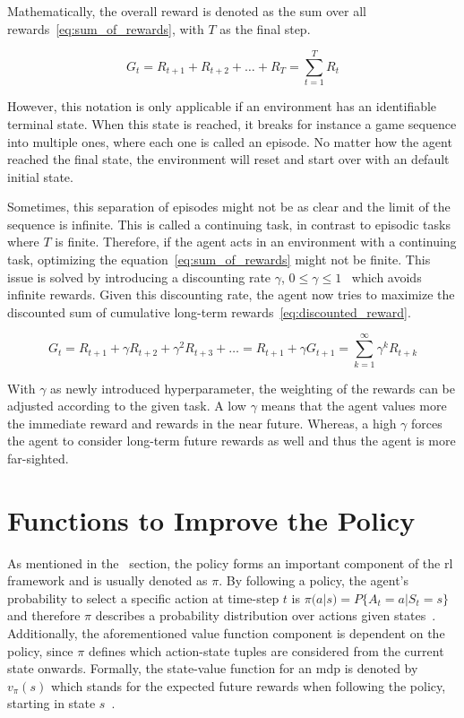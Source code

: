 \documentclass[draft,final]{vutinfth} %
\begin{document}
    Mathematically, the overall reward is denoted as the sum over all rewards~\eqref{eq:sum_of_rewards}, with $T$ as the final step.

    \begin{equation}
        G_t=R_{t+1} + R_{t+2}+ \ldots + R_{T}  =\sum_{t=1}^{T} R_{t}\label{eq:sum_of_rewards}
    \end{equation}

    However, this notation is only applicable if an environment has an identifiable terminal state.
    When this state is reached, it breaks for instance a game sequence into multiple ones, where each one is called an episode.
    No matter how the agent reached the final state, the environment will reset and start over with an default initial state.

    Sometimes, this separation of episodes might not be as clear and the limit of the sequence is infinite.
    This is called a continuing task, in contrast to episodic tasks where $T$ is finite.
    Therefore, if the agent acts in an environment with a continuing task, optimizing the equation~\eqref{eq:sum_of_rewards} might not be finite.
    This issue is solved by introducing a discounting rate $\gamma$, $0 \leq \gamma \leq 1$~\citep{sutton_reinforcement_2018} which avoids infinite rewards.
    Given this discounting rate, the agent now tries to maximize the discounted sum of cumulative long-term rewards~\eqref{eq:discounted_reward}.

    \begin{equation}
        G_t = R_{t+1} + \gamma R_{t+2}+ \gamma^2 R_{t+3} + \ldots = R_{t+1} + \gamma G_{t+1} = \sum_{k=1}^{\infty} \gamma^k R_{t+k}\label{eq:discounted_reward}
    \end{equation}

    With $\gamma$ as newly introduced hyperparameter, the weighting of the rewards can be adjusted according to the given task.
    A low $\gamma$ means that the agent values more the immediate reward and rewards in the near future.
    Whereas, a high $\gamma$ forces the agent to consider long-term future rewards as well and thus the agent is more far-sighted.


    \section{Functions to Improve the Policy}\label{sec:functions-to-improve-the-policy}
    As mentioned in the~ section, the policy forms an important component of the \gls{rl} framework and is usually denoted as $\pi$.
    By following a policy, the agent's probability to select a specific action at time-step $t$ is $\pi(a|s) = P\{A_t=a|S_t=s\}$ and therefore $\pi$ describes a probability distribution over actions given states~\citep{silver_lecture_2015-1}.
    Additionally, the aforementioned value function component is dependent on the policy, since $\pi$ defines which action-state tuples are considered from the current state onwards.
    Formally, the state-value function for an \gls{mdp} is denoted by $v_\pi(s)$ which stands for the expected future rewards when following the policy, starting in state $s$~\citep{sutton_reinforcement_2018}.
\end{document}
